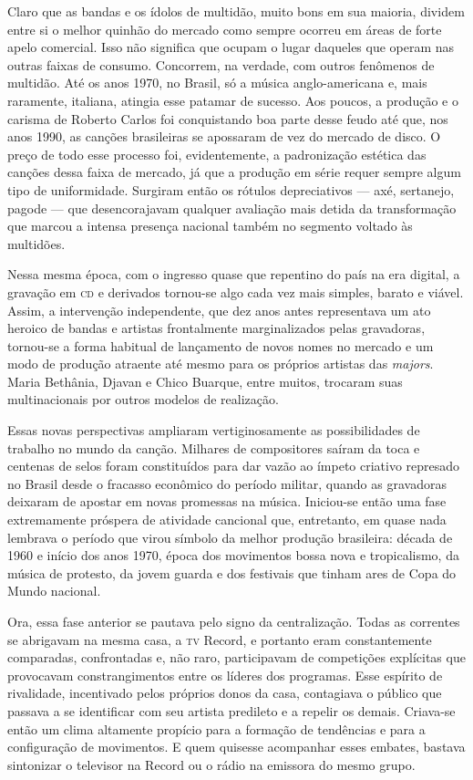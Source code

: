 Claro que as bandas e os ídolos de multidão, muito bons em sua maioria,
dividem entre si o melhor quinhão do mercado como sempre ocorreu em
áreas de forte apelo comercial. Isso não significa que ocupam o lugar
daqueles que operam nas outras faixas de consumo. Concorrem, na verdade,
com outros fenômenos de multidão. Até os anos 1970, no Brasil, só a
música anglo-americana e, mais raramente, italiana, atingia esse
patamar de sucesso. Aos poucos, a produção e o carisma de Roberto Carlos
foi conquistando boa parte desse feudo até que, nos anos 1990, as
canções brasileiras se apossaram de vez do mercado de disco. O preço de
todo esse processo foi, evidentemente, a padronização estética das
canções dessa faixa de mercado, já que a produção em série requer sempre
algum tipo de uniformidade. Surgiram então os rótulos depreciativos ---
axé, sertanejo, pagode --- que desencorajavam qualquer avaliação mais
detida da transformação que marcou a intensa presença nacional também no
segmento voltado às multidões.

Nessa mesma época, com o ingresso quase que repentino do país na era
digital, a gravação em \textsc{cd} e derivados tornou-se algo cada vez mais
simples, barato e viável. Assim, a intervenção independente, que dez
anos antes representava um ato heroico de bandas e artistas frontalmente
marginalizados pelas gravadoras, tornou-se a forma habitual de
lançamento de novos nomes no mercado e um modo de produção atraente até
mesmo para os próprios artistas das \textit{majors}. Maria Bethânia,
Djavan e Chico Buarque, entre muitos, trocaram suas multinacionais por
outros modelos de realização.

Essas novas perspectivas ampliaram vertiginosamente as possibilidades de
trabalho no mundo da canção. Milhares de compositores saíram da toca e
centenas de selos foram constituídos para dar vazão ao ímpeto criativo
represado no Brasil desde o fracasso econômico do período militar,
quando as gravadoras deixaram de apostar em novas promessas na música.
Iniciou-se então uma fase extremamente próspera de atividade cancional
que, entretanto, em quase nada lembrava o período que virou símbolo da
melhor produção brasileira: década de 1960 e início dos anos 1970, época
dos movimentos bossa nova e tropicalismo, da música de protesto, da
jovem guarda e dos festivais que tinham ares de Copa do Mundo
nacional.

Ora, essa fase anterior se pautava pelo signo da centralização. Todas as
correntes se abrigavam na mesma casa, a \textsc{tv} Record, e portanto eram
constantemente comparadas, confrontadas e, não raro, participavam de
competições explícitas que provocavam constrangimentos entre os líderes
dos programas. Esse espírito de rivalidade, incentivado pelos próprios
donos da casa, contagiava o público que passava a se identificar com seu
artista predileto e a repelir os demais. Criava-se então um clima
altamente propício para a formação de tendências e para a configuração
de movimentos. E quem quisesse acompanhar esses embates, bastava
sintonizar o televisor na Record ou o rádio na emissora do mesmo grupo.

